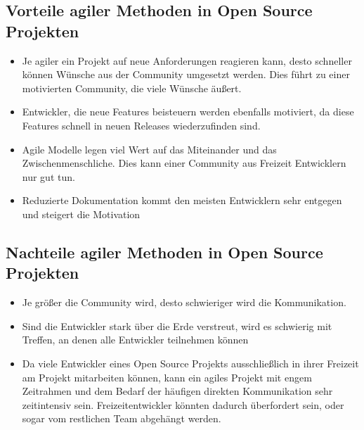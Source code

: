 \subsection{Vorteile agiler Methoden in Open Source Projekten}

\begin{itemize}
	\item Je agiler ein Projekt auf neue Anforderungen reagieren kann, desto schneller können Wünsche aus der Community umgesetzt werden. Dies führt zu einer motivierten Community, die viele Wünsche äußert.
	\item Entwickler, die neue Features beisteuern werden ebenfalls motiviert, da diese Features schnell in neuen Releases wiederzufinden sind.
	\item Agile Modelle legen viel Wert auf das Miteinander und das Zwischenmenschliche. Dies kann einer Community aus Freizeit Entwicklern nur gut tun.
	\item Reduzierte Dokumentation kommt den meisten Entwicklern sehr entgegen und steigert die Motivation
\end{itemize}
  
\subsection{Nachteile agiler Methoden in Open Source Projekten}
\begin{itemize}
	\item Je größer die Community wird, desto schwieriger wird die Kommunikation.
	\item Sind die Entwickler stark über die Erde verstreut, wird es schwierig mit Treffen, an denen alle Entwickler teilnehmen können
	\item Da viele Entwickler eines Open Source Projekts ausschließlich in ihrer Freizeit am Projekt mitarbeiten können, kann ein agiles Projekt mit engem Zeitrahmen und dem Bedarf der häufigen direkten Kommunikation sehr zeitintensiv sein. Freizeitentwickler könnten dadurch überfordert sein, oder sogar vom restlichen Team abgehängt werden.
\end{itemize}

